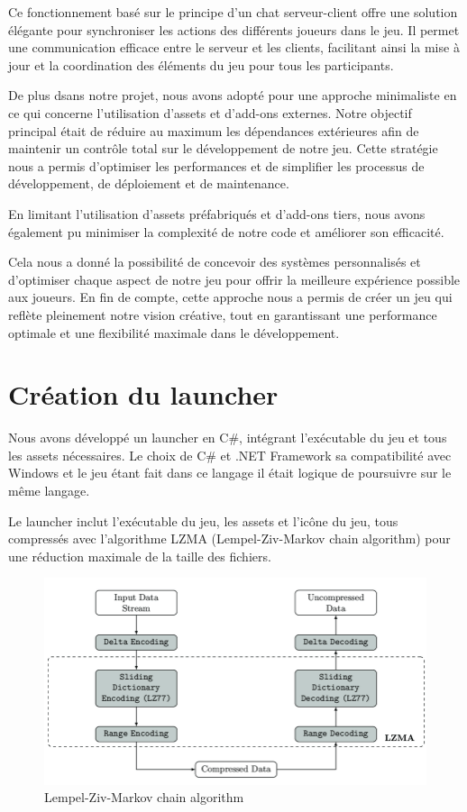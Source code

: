 \documentclass[
	article,			%
	11pt,				%
	oneside,			%
	a4paper,			%
	chapter=TITLE,
	french,			%
	sumario=tradicional
	]{base_nt}
\begin{document}
Ce fonctionnement basé sur le principe d'un chat serveur-client offre une solution élégante pour synchroniser les actions des différents joueurs dans le jeu. Il permet une communication efficace entre le serveur et les clients, facilitant ainsi la mise à jour et la coordination des éléments du jeu pour tous les participants.

\newpage

De plus dsans notre projet, nous avons adopté pour une approche minimaliste en ce qui concerne l'utilisation d'assets et d'add-ons externes. Notre objectif principal était de réduire au maximum les dépendances extérieures afin de maintenir un contrôle total sur le développement de notre jeu. Cette stratégie nous a permis d'optimiser les performances et de simplifier les processus de développement, de déploiement et de maintenance.

En limitant l'utilisation d'assets préfabriqués et d'add-ons tiers, nous avons également pu minimiser la complexité de notre code et améliorer son efficacité.

Cela nous a donné la possibilité de concevoir des systèmes personnalisés et d'optimiser chaque aspect de notre jeu pour offrir la meilleure expérience possible aux joueurs. En fin de compte, cette approche nous a permis de créer un jeu qui reflète pleinement notre vision créative, tout en garantissant une performance optimale et une flexibilité maximale dans le développement.

\newpage

\section{Création du launcher}

Nous avons développé un launcher en C\#, intégrant l'exécutable du jeu et tous les assets nécessaires. Le choix de C\# et .NET Framework sa compatibilité avec Windows et le jeu étant fait dans ce langage il était logique de poursuivre sur le même langage.

Le launcher inclut l'exécutable du jeu, les assets et l'icône du jeu, tous compressés avec l'algorithme LZMA (Lempel-Ziv-Markov chain algorithm) pour une réduction maximale de la taille des fichiers. 

\begin{figure}[ht]
	\caption{Lempel-Ziv-Markov chain
algorithm}
	\centering
	\includegraphics[width=1\linewidth]{paper9.png}
	\legend{}
	
\end{figure}
\end{document}
